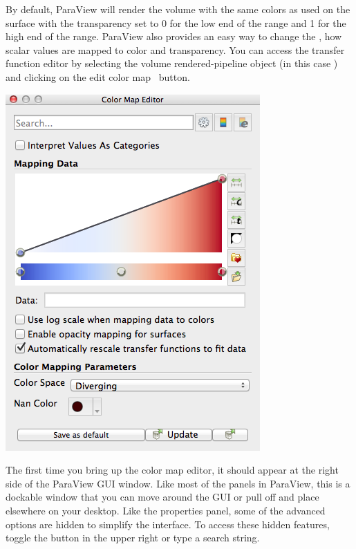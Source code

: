 By default, ParaView will render the volume with the same colors as used on
the surface with the transparency set to 0 for the low end of the range and
1 for the high end of the range.  ParaView also provides an easy way to
change the , how scalar values are mapped to
color and transparency.  You can access the transfer function editor by
selecting the volume rendered-pipeline object (in this case
) and clicking on the edit color
map~ button.   

\begin{inlinefig}
  \includegraphics[width=0.8\scw]{images/ColorMapEditor}
\end{inlinefig}

The first time you bring up the color map editor, it should appear at the
right side of the ParaView GUI window. Like most of the panels in ParaView,
this is a dockable window that you can move around the GUI or pull off and
place elsewhere on your desktop. Like the properties panel, some of the
advanced options are hidden to simplify the interface. To access these
hidden features, toggle the  button in the upper right
or type a search string.

